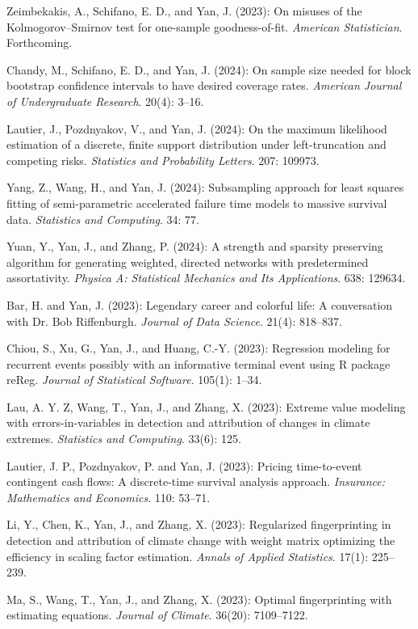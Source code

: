 \documentclass[Statistics]{vita}
\begin{document}
\begin{vita}
\begin{Publications}
\begin{RefereedJournalArticles}
  \item *Zeimbekakis, A., Schifano, E. D., and Yan, J. (2023): On misuses of the Kolmogorov--Smirnov test for one-sample goodness-of-fit. {\em American Statistician\/}. Forthcoming.
  \item *Chandy, M., Schifano, E. D., and Yan, J. (2024): On sample size needed for block bootstrap confidence intervals to have desired coverage rates. {\em American Journal of Undergraduate Research\/}. 20(4): 3--16.
  \item *Lautier, J., Pozdnyakov, V., and Yan, J. (2024): On the maximum likelihood estimation of a discrete, finite support distribution under left-truncation and competing risks. {\em Statistics and Probability Letters\/}. 207: 109973.
  \item *Yang, Z., Wang, H., and Yan, J. (2024): Subsampling approach for least squares fitting of semi-parametric accelerated failure time models to massive survival data. {\em Statistics and Computing\/}. 34: 77.
  \item *Yuan, Y., Yan, J., and Zhang, P. (2024): A strength and sparsity preserving algorithm for generating weighted, directed networks with predetermined assortativity. {\em Physica A: Statistical Mechanics and Its Applications\/}. 638: 129634.
  \item Bar, H. and Yan, J. (2023): Legendary career and colorful life: A conversation with Dr. Bob Riffenburgh. {\em Journal of Data Science\/}. 21(4): 818--837.
  \item Chiou, S., Xu, G., Yan, J., and Huang, C.-Y. (2023): Regression modeling for recurrent events possibly with an informative terminal event using R package {reReg}. {\em Journal of Statistical Software\/}. 105(1): 1--34.
  \item *Lau, A. Y. Z, Wang, T., Yan, J., and Zhang, X. (2023): Extreme value modeling with errors-in-variables in detection and attribution of changes in climate extremes. {\em Statistics and Computing\/}. 33(6): 125.
  \item *Lautier, J. P., Pozdnyakov, P. and Yan, J. (2023): Pricing time-to-event contingent cash flows: A discrete-time survival analysis approach. {\em Insurance: Mathematics and Economics\/}. 110: 53--71.
  \item *Li, Y., Chen, K., Yan, J., and Zhang, X. (2023): Regularized fingerprinting in detection and attribution of climate change with weight matrix optimizing the efficiency in scaling factor estimation. {\em Annals of Applied Statistics\/}. 17(1): 225--239.
   \item *Ma, S., Wang, T., Yan, J., and Zhang, X. (2023): Optimal fingerprinting with estimating equations. {\em Journal of Climate\/}. 36(20): 7109--7122.

\end{RefereedJournalArticles}
\end{Publications}
\end{vita}
\end{document}
